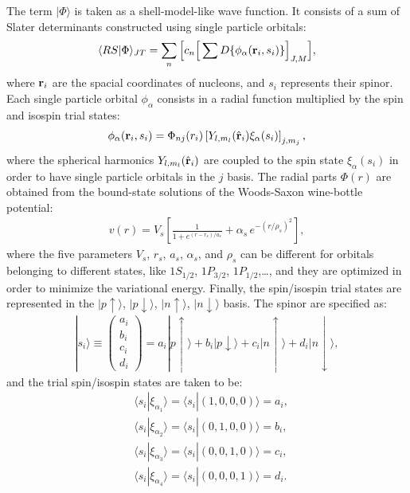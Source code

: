 \documentclass[aps,prc,twocolumn,superscriptaddress,floatfix]{revtex4-1}
\begin{document}
The term $|\Phi\rangle$ is taken as a shell-model-like wave function. 
It consists of a sum of Slater determinants constructed using single particle orbitals:
\begin{align} 
\langle RS|\Phi\rangle_{JT} = \sum_n\Big[c_n\Big[\sum D\{\phi_\alpha(\vb{r}_i,s_i)\}\Big]_{J,M}\Big] ,
\end{align}
where $\vb{r}_i$ are the spacial coordinates of nucleons, and $s_i$ represents their spinor.
Each single particle orbital $\phi_\alpha$ consists in a radial function multiplied by the spin and
isospin trial states:
\begin{align}
\phi_\alpha(\vb{r}_i,s_i)=\Phi_{nj}(r_i)\left[Y_{l,m_l}(\hat{\vb{r}}_i)\xi_\alpha(s_i)\right]_{j,m_j} ,
\end{align}
where the spherical harmonics $Y_{l,m_l}(\hat{\vb{r}}_i)$ are coupled to the spin state $\xi_\alpha(s_i)$
in order to have single particle orbitals in the $j$ basis.
The radial parts $\Phi(r)$ are obtained from the bound-state solutions of the Woods-Saxon 
wine-bottle potential:
\begin{align}
v(r)=V_s\left[\frac{1}{1+e^{(r-r_s)/a_s}}+\alpha_s\,e^{-(r/{\rho_s})^2}\right] ,
\end{align}
where the five parameters $V_s$, $r_s$, $a_s$, $\alpha_s$, and $\rho_s$ can be different for orbitals
belonging to different states, like $1S_{1/2}$, $1P_{3/2}$, $1P_{1/2}$,\ldots, and they are 
optimized in order to minimize the variational energy.
Finally, the spin/isospin trial states are represented in the $|p\uparrow\rangle$, $|p\downarrow\rangle$,
$|n\uparrow\rangle$, $|n\downarrow\rangle$ basis. The spinor are specified as:
\begin{align}
|s_i\rangle \equiv \left(\begin{array}{c} 
a_i \\ b_i \\ c_i \\ d_i
\end{array}\right)
=a_i|p\uparrow\rangle+b_i|p\downarrow\rangle+c_i|n\uparrow\rangle+d_i|n\downarrow\rangle ,
\end{align}
and the trial spin/isospin states are taken to be:
\begin{align}
&\langle s_i|\xi_{\alpha_1}\rangle=\langle s_i|(1,0,0,0)\rangle=a_i,
\nonumber \\
&\langle s_i|\xi_{\alpha_2}\rangle=\langle s_i|(0,1,0,0)\rangle=b_i,
\nonumber \\
&\langle s_i|\xi_{\alpha_3}\rangle=\langle s_i|(0,0,1,0)\rangle=c_i,
\nonumber \\
&\langle s_i|\xi_{\alpha_4}\rangle=\langle s_i|(0,0,0,1)\rangle=d_i .
\end{align}
\end{document}
